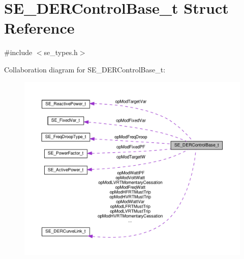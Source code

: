 \hypertarget{structSE__DERControlBase__t}{}\section{S\+E\+\_\+\+D\+E\+R\+Control\+Base\+\_\+t Struct Reference}
\label{structSE__DERControlBase__t}


{\ttfamily \#include $<$se\+\_\+types.\+h$>$}



Collaboration diagram for S\+E\+\_\+\+D\+E\+R\+Control\+Base\+\_\+t\+:\nopagebreak
\begin{figure}[H]
\begin{center}
\leavevmode
\includegraphics[width=350pt]{structSE__DERControlBase__t__coll__graph}
\end{center}
\end{figure}
